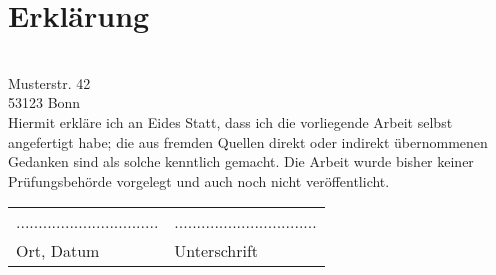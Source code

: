 \section*{Erklärung}
\ThesisAuthor \\
Musterstr. 42 \\
53123 Bonn \\
\newline
Hiermit erkläre ich an Eides Statt, dass ich die vorliegende Arbeit selbst angefertigt habe; die aus fremden Quellen direkt oder indirekt übernommenen Gedanken sind als solche kenntlich gemacht.
\newline
Die Arbeit wurde bisher keiner Prüfungsbehörde vorgelegt und auch noch nicht veröffentlicht.
\newline


\begin{tabular}{ll}
................................ & ................................ \\ 
Ort, Datum & Unterschrift
\end{tabular}
